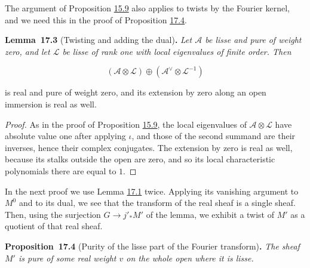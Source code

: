 \documentclass[11pt]{article}
\newenvironment{bpstatement}[2]{\par\addvspace{0.6\baselineskip}\noindent\textbf{#1}#2\textbf{.}\enspace\ignorespaces}
  {\par\addvspace{0.4\baselineskip}}
\newenvironment{bpstatementit}[2]{\begin{bpstatement}{#1}{#2}\itshape\ignorespaces}{\end{bpstatement}}
\begin{document}
\label{bp230}%
The argument of Proposition \hyperref[bp148]{15.9} also applies to twists by the Fourier kernel, and we need this in the proof of Proposition \hyperref[bp234]{17.4}.

\label{bp231}%
\begin{bpstatementit}{Lemma~17.3}{ (Twisting and adding the dual)}
Let \(\mathcal A\) be lisse and pure of weight zero, and let \(\mathcal L\) be lisse of rank one with local eigenvalues of finite order. Then

\[
(\mathcal A\otimes\mathcal L)
\oplus(\mathcal A^\vee\otimes\mathcal L^{-1})
\]

is real and pure of weight zero, and its extension by zero along an open immersion is real as well.
\end{bpstatementit}

\begin{proof}[{Proof}]\label{bp232}%
As in the proof of Proposition \hyperref[bp148]{15.9}, the local eigenvalues of \(\mathcal A\otimes\mathcal L\) have absolute value one after applying \(\iota\), and those of the second summand are their inverses, hence their complex conjugates. The extension by zero is real as well, because its stalks outside the open are zero, and so its local characteristic polynomials there are equal to \(1\).
\end{proof}

\label{bp233}%
In the next proof we use Lemma \hyperref[bp227]{17.1} twice. Applying its vanishing argument to \(M^0\) and to its dual, we see that the transform of the real sheaf is a single sheaf. Then, using the surjection \(G\to j'_*M'\) of the lemma, we exhibit a twist of \(M'\) as a quotient of that real sheaf.

\label{bp234}%
\begin{bpstatementit}{Proposition~17.4}{ (Purity of the lisse part of the Fourier transform)}
The sheaf \(M'\) is pure of some real weight \(v\) on the whole open where it is lisse.
\end{bpstatementit}
\end{document}
